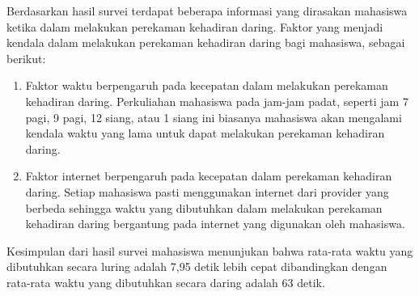 Berdasarkan hasil survei terdapat beberapa informasi yang dirasakan mahasiswa ketika dalam melakukan perekaman kehadiran daring. Faktor yang menjadi kendala dalam melakukan perekaman kehadiran daring bagi mahasiswa, sebagai berikut:
\begin{enumerate}
	\item Faktor waktu berpengaruh pada kecepatan dalam melakukan perekaman kehadiran daring. Perkuliahan mahasiswa pada jam-jam padat, seperti jam 7 pagi, 9 pagi, 12 siang, atau 1 siang ini biasanya mahasiswa akan mengalami kendala waktu yang lama untuk dapat melakukan perekaman kehadiran daring.
	\item Faktor internet berpengaruh pada kecepatan dalam perekaman kehadiran daring. Setiap mahasiswa pasti menggunakan internet dari provider yang berbeda sehingga waktu yang dibutuhkan dalam melakukan perekaman kehadiran daring bergantung pada internet yang digunakan oleh mahasiswa.
\end{enumerate}

Kesimpulan dari hasil survei mahasiswa menunjukan bahwa rata-rata waktu yang dibutuhkan secara luring adalah 7,95 detik lebih cepat dibandingkan dengan rata-rata waktu yang dibutuhkan secara daring adalah 63 detik.

